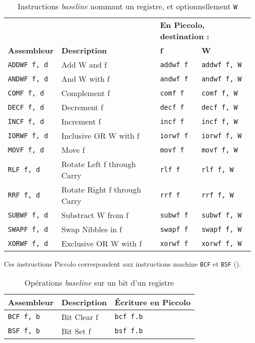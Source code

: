 \begin{table}[!ht]
  \centering
  \small
  \begin{tabular}{llll}
     &  & \multicolumn{2}{l}{\textbf{En Piccolo, destination :}} \\
    \textbf{Assembleur} & \textbf{Description} & \textbf{f} & \textbf{W}\\
    \hline
    \texttt{ADDWF f, d} & Add W and f & \texttt{addwf f}  & \texttt{addwf f, W} \\
    \texttt{ANDWF f, d} & And W with f & \texttt{andwf f} & \texttt{andwf f, W}\\
    \texttt{COMF f, d} & Complement f & \texttt{comf f} & \texttt{comf f, W}\\
    \texttt{DECF f, d} & Decrement f & \texttt{decf f} & \texttt{decf f, W}\\
    \texttt{INCF f, d} & Increment f & \texttt{incf f}& \texttt{incf f, W}\\
    \texttt{IORWF f, d} & Inclusive OR W with f & \texttt{iorwf f} & \texttt{iorwf f, W}\\
    \texttt{MOVF f, d} & Move f & \texttt{movf f} & \texttt{movf f, W}\\
    \texttt{RLF f, d} & Rotate Left f through Carry & \texttt{rlf f} & \texttt{rlf f, W}\\
    \texttt{RRF f, d} & Rotate Right f through Carry & \texttt{rrf f} & \texttt{rrf f, W}\\
    \texttt{SUBWF f, d} & Substract W from f & \texttt{subwf f} & \texttt{subwf f, W}\\
    \texttt{SWAPF f, d} & Swap Nibbles in f & \texttt{swapf f} & \texttt{swapf f, W}\\
    \texttt{XORWF f, d} & Exclusive OR W with f & \texttt{xorwf f} & \texttt{xorwf f, W}\\
  \hline
  \end{tabular}
  \caption{Instructions \emph{baseline} nommant un registre, et optionnellement \texttt{W}}
\end{table}



Ces instructions Piccolo correspondent aux instructions machine \texttt{BCF} et \texttt{BSF} ().

\begin{table}[!ht]
  \centering
  \small
  \begin{tabular}{lll}
    \textbf{Assembleur} & \textbf{Description} & \textbf{Écriture en Piccolo}\\
    \hline
    \texttt{BCF f, b} & Bit Clear f & \texttt{bcf f.b} \\
    \texttt{BSF f, b} & Bit Set f & \texttt{bsf f.b} \\
  \hline
  \end{tabular}
  \caption{Opérations \emph{baseline} sur un bit d'un registre}
\end{table}

